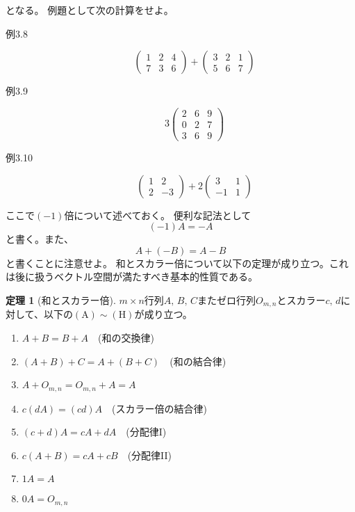 \documentclass[10pt]{jsarticle}
\theoremstyle{definition}%
\newtheorem{thm}{定理}[section]%
\numberwithin{equation}{section}%
\begin{document}
となる。
例題として次の計算をせよ。
\begin{description}
  \item[例3.8] 
  \begin{equation}
    \left(  
      \begin{matrix}
        1 & 2 & 4 \\
        7 & 3 & 6
      \end{matrix}
    \right)+\left(  
      \begin{matrix}
        3 & 2 & 1 \\
        5 & 6 & 7
      \end{matrix}
    \right)
  \end{equation}
  \item[例3.9] 
  \begin{equation}
   3 \left( 
      \begin{matrix}
        2 & 6 & 9 \\
        0 & 2 & 7  \\
        3 & 6 & 9 
      \end{matrix}
    \right)
  \end{equation}
  \item[例3.10] \begin{equation}
    \left(  
      \begin{matrix}
        1 & 2  \\
        2 & -3 
      \end{matrix}
    \right)+ 2 \left(  
      \begin{matrix}
        3 & 1 \\
        -1 & 1 
      \end{matrix}
    \right)
  \end{equation}
\end{description}
ここで$(-1)$倍について述べておく。
便利な記法として
\begin{equation}
  (-1)A=-A
\end{equation}
と書く。また、
\begin{equation}
  A+(-B)=A-B
\end{equation}
と書くことに注意せよ。
和とスカラー倍について以下の定理が成り立つ。これは後に扱うベクトル空間が満たすべき基本的性質である。
\begin{screen}
  \begin{thm}[和とスカラー倍]
  $m\times n$行列$A,\, B,\, C$またゼロ行列$O_{m,n}$とスカラー$c, \, d$に対して、以下の$(\mathrm{A})\sim (\mathrm{H})$が成り立つ。
  \begin{enumerate}
    \item  $A+B=B+A\quad $(和の交換律)
    \item  $(A+B)+C=A+(B+C)\quad $(和の結合律)
    \item $A+O_{m,n}=O_{m,n}+A=A$
    \item $c(dA)=(cd)A\quad $(スカラー倍の結合律)
    \item $(c+d)A=cA+dA \quad $(分配律I)
    \item $c(A+B)=cA+cB \quad $(分配律II)
    \item $1A=A$
    \item $0A=O_{m,n}$
  \end{enumerate}
  \end{thm}
\end{screen}
\end{document}
